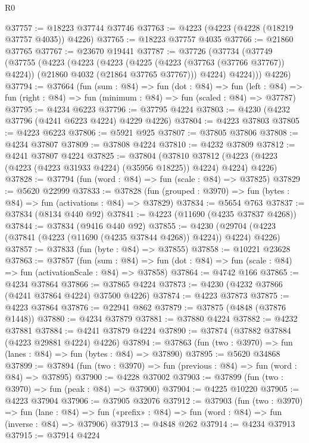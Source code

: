 \begin{lexlean}{R0}
\begin{coremodule}
@37757 := @18223 @37744 @37746
@37763 := @4223 (@4223 (@4228 (@18219 @37757 @4035)) @4226)
@37765 := @18223 @37757 @4035
@37766 := @21860 @37765
@37767 := @23670 @19441
@37787 := @37726
    (@37734
      (@37749
        (@37755
          (@4223
            (@4223
              (@4223
                (@4225 (@4223 (@37763 (@37766 @37767)) @4224))
                (@21860 @4032 (@21864 @37765 @37767)))
              @4224)
            @4224)))
      @4226)
@37794 := @37664
    (fun (sum : @84) =>
    fun (dot : @84) =>
    fun (left : @84) => fun (right : @84) => fun (minimum : @84) => fun (scaled : @84) => @37787)
@37795 := @4234 @6223
@37796 := @37795 @4224
@37803 := @4230 (@4232 @37796 (@4241 @6223 @4224) @4229 @4226)
@37804 := @4223 @37803
@37805 := @4223 @6223
@37806 := @5921 @925
@37807 := @37805 @37806
@37808 := @4234 @37807
@37809 := @37808 @4224
@37810 := @4232 @37809
@37812 := @4241 @37807 @4224
@37825 := @37804
    (@37810 @37812 (@4223 (@4223 (@4223 (@4223 @31933 @4224) (@35956 @18225)) @4224) @4224) @4226)
@37828 := @37794 (fun (word : @84) => fun (scale : @84) => @37825)
@37829 := @5620 @22999
@37833 := @37828 (fun (grouped : @3970) => fun (bytes : @84) => fun (activations : @84) => @37829)
@37834 := @5654 @763
@37837 := @37834 (@8134 @440 @92)
@37841 := @4223 (@11690 (@4235 @37837 @4268))
@37844 := @37834 (@9416 @440 @92)
@37855 := @4230 (@29704 (@4223 (@37841 (@4223 (@11690 (@4235 @37844 @4268)) @4224)) @4224) @4226)
@37857 := @37833 (fun (byte : @84) => @37855)
@37858 := @10221 @23628
@37863 := @37857
    (fun (sum : @84) =>
    fun (dot : @84) => fun (scale : @84) => fun (activationScale : @84) => @37858)
@37864 := @4742 @166
@37865 := @4234 @37864
@37866 := @37865 @4224
@37873 := @4230 (@4232 @37866 (@4241 @37864 @4224) @37500 @4226)
@37874 := @4223 @37873
@37875 := @4223 @37864
@37876 := @22941 @862
@37879 := @37875 (@4848 (@37876 @1448))
@37880 := @4234 @37879
@37881 := @37880 @4224
@37882 := @4232 @37881
@37884 := @4241 @37879 @4224
@37890 := @37874 (@37882 @37884 (@4223 @29881 @4224) @4226)
@37894 := @37863 (fun (two : @3970) => fun (lanes : @84) => fun (bytes : @84) => @37890)
@37895 := @5620 @34868
@37899 := @37894 (fun (two : @3970) => fun (previous : @84) => fun (word : @84) => @37895)
@37900 := @4228 @37002
@37903 := @37899 (fun (two : @3970) => fun (peak : @84) => @37900)
@37904 := @4225 @10220
@37905 := @4223 @37904
@37906 := @37905 @32076
@37912 := @37903
    (fun (two : @3970) =>
    fun (lane : @84) => fun («prefix» : @84) => fun (word : @84) => fun (inverse : @84) => @37906)
@37913 := @4848 @262
@37914 := @4234 @37913
@37915 := @37914 @4224

\end{coremodule}
\end{lexlean}
